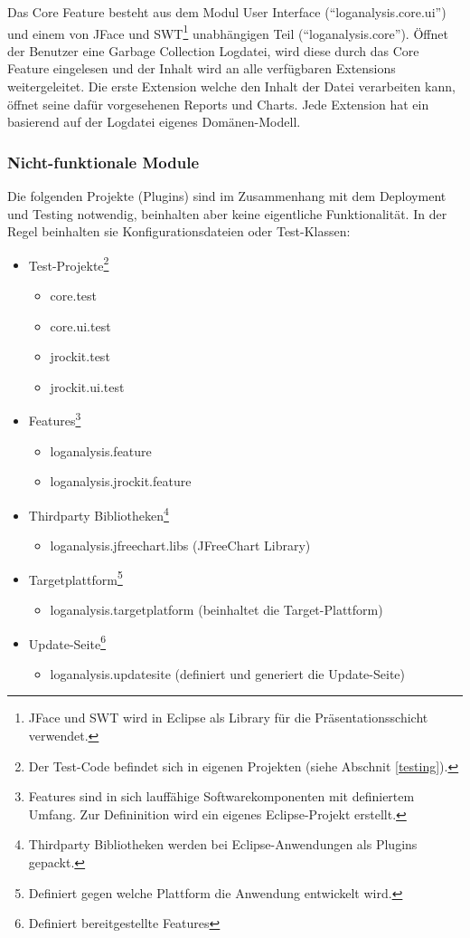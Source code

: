 Das Core Feature besteht aus dem Modul User Interface (``loganalysis.core.ui'') und einem von JFace und SWT\footnote{JFace und SWT wird in Eclipse als Library für die Präsentationsschicht verwendet.} unabhängigen Teil (``loganalysis.core''). Öffnet der Benutzer eine Garbage Collection Logdatei, wird diese durch das Core Feature eingelesen und der Inhalt wird an alle verfügbaren Extensions weitergeleitet. Die erste Extension welche den Inhalt der Datei verarbeiten kann, öffnet seine dafür vorgesehenen Reports und Charts. Jede Extension hat ein basierend auf der Logdatei eigenes Domänen-Modell.

\subsubsection{Nicht-funktionale Module}
Die folgenden Projekte (Plugins) sind im Zusammenhang mit dem Deployment und Testing notwendig, beinhalten aber keine eigentliche Funktionalität. In der Regel beinhalten sie Konfigurationsdateien oder Test-Klassen:
\begin{itemize}
	\item Test-Projekte\footnote{Der Test-Code befindet sich in eigenen Projekten (siehe Abschnit \ref{testing}).}
		\begin{itemize}
			\item core.test
			\item core.ui.test
			\item jrockit.test
			\item jrockit.ui.test
		\end{itemize}
	\item  Features\footnote{Features sind in sich lauffähige Softwarekomponenten mit definiertem Umfang. Zur Defininition wird ein eigenes Eclipse-Projekt erstellt.}
		\begin{itemize}
			\item loganalysis.feature
			\item loganalysis.jrockit.feature
		\end{itemize}
	\item  Thirdparty Bibliotheken\footnote{Thirdparty Bibliotheken werden bei Eclipse-Anwendungen als Plugins gepackt.}
		\begin{itemize}
			\item  loganalysis.jfreechart.libs (JFreeChart Library)
		\end{itemize}
	\item  Targetplattform\footnote{Definiert gegen welche Plattform die Anwendung entwickelt wird.}
		\begin{itemize}
			\item  loganalysis.targetplatform (beinhaltet die Target-Plattform)
		\end{itemize}
	\item  Update-Seite\footnote{Definiert bereitgestellte Features}
		\begin{itemize}
			\item loganalysis.updatesite (definiert und generiert die Update-Seite)
		\end{itemize}
\end{itemize}


